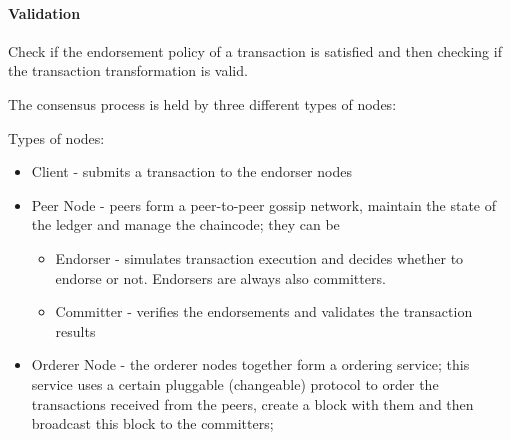\paragraph{Validation} Check if the endorsement policy of a transaction is satisfied and then checking if the transaction transformation is valid.

The consensus process is held by three different types of nodes:

Types of nodes:
\begin{itemize}
\item Client - submits a transaction to the endorser nodes
\item Peer Node - peers form a peer-to-peer gossip network, maintain the state of the ledger and manage the chaincode; they can be 
	\begin{itemize}
    \item Endorser - simulates transaction execution and decides whether to endorse or not. Endorsers are always also committers.
    \item Committer - verifies the endorsements and validates the transaction results 
    \end{itemize}
\item Orderer Node - the orderer nodes together form a ordering service; this service uses a certain pluggable (changeable) protocol to order the transactions received from the peers, create a block with them and then broadcast this block to the committers;
\end{itemize}

